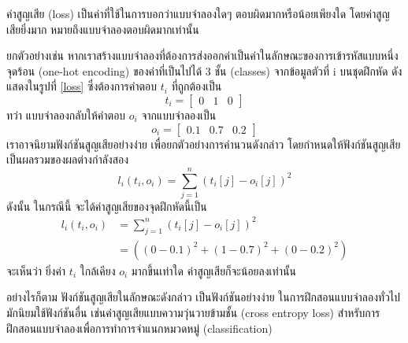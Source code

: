 \documentclass{cpereport}
\begin{document}
ค่าสูญเสีย (loss) เป็นค่าที่ใช้ในการบอกว่าแบบจำลองใดๆ ตอบผิดมากหรือน้อยเพียงใด โดยค่าสูญเสียยิ่งมาก หมายถึงแบบจำลองตอบผิดมากเท่านั้น

ยกตัวอย่างเช่น หากเราสร้างแบบจำลองที่ต้องการส่งออกค่าเป็นค่าในลักษณะของการเข้ารหัสแบบหนึ่งจุดร้อน (one-hot encoding) ของค่าที่เป็นไปได้ 3 ชั้น (classes) จากข้อมูลตัวที่ i บนชุดฝึกหัด ดังแสดงในรูปที่ \ref{loss} ซึ่งต้องการคำตอบ $t_i$ ที่ถูกต้องเป็น
$$t_i = 
\begin{bmatrix}
    0 & 1 & 0
\end{bmatrix}
$$
ทว่า แบบจำลองกลับให้คำตอบ $o_i$ จากแบบจำลองเป็น
$$o_i = 
\begin{bmatrix}
    0.1 & 0.7 & 0.2
\end{bmatrix}
$$
เราอาจนิยามฟังก์ชันสูญเสียอย่างง่าย เพื่อยกตัวอย่างการคำนวนดังกล่าว โดยกำหนดให้ฟังก์ชันสูญเสียเป็นผลรวมของผลต่างกำลังสอง
$$
l_i\left(t_i, o_i\right) = \sum_{j=1}^{n}{\left(t_i[j] - o_i[j]\right)^2}
$$
ดังนั้น ในกรณีนี้ จะได้ค่าสูญเสียของจุดฝึกหัดนี้เป็น
\begin{align*}
    l_i\left(t_i, o_i\right) &= \sum_{j=1}^{n}{\left(t_i[j] - o_i[j]\right)^2}\\
    &= \left((0-0.1)^2 + (1-0.7)^2 + (0-0.2)^2\right)
\end{align*}
จะเห็นว่า ยิ่งค่า $t_i$ ใกล้เคียง $o_i$ มากขึ้นเท่าใด ค่าสูญเสียก็จะน้อยลงเท่านั้น

อย่างไรก็ตาม ฟังก์ชันสูญเสียในลักษณะดังกล่าว เป็นฟังก์ชันอย่างง่าย ในการฝึกสอนแบบจำลองทั่วไปมักนิยมใช้ฟังก์ชันอื่น เช่นค่าสูญเสียแบบความวุ่นวายข้ามชั้น (cross entropy loss) สำหรับการฝึกสอนแบบจำลองเพื่อการทำการจำแนกหมวดหมู่ (classification)
 

\end{document}
